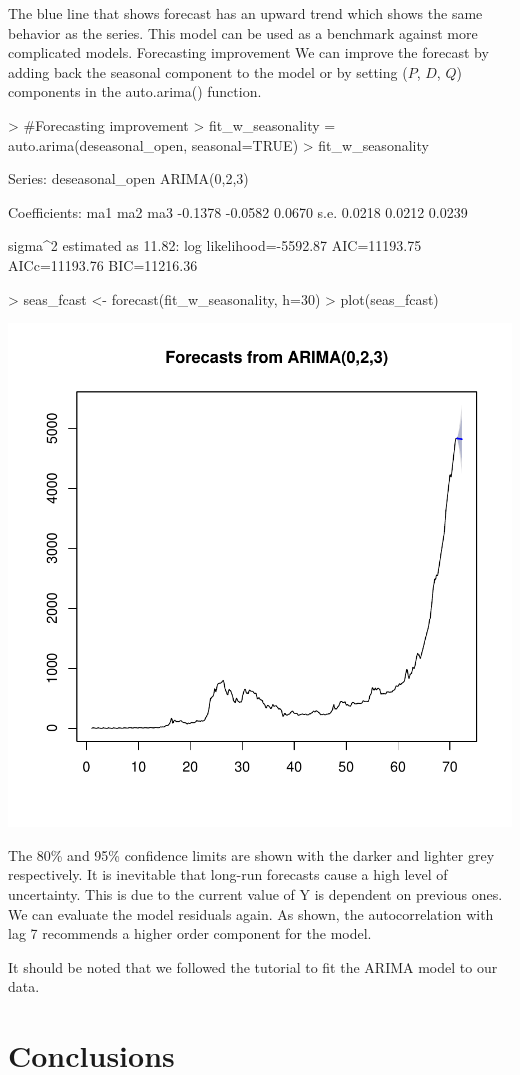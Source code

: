 \documentclass{article}
\begin{document}
The blue line that shows forecast has an upward trend which shows the same behavior as the series. This model can be used as a benchmark against more complicated models.
Forecasting improvement  
We can improve the forecast by adding back the seasonal component to the model or by setting ($P$, $D$, $Q$) components in the auto.arima() function. 
\begin{Schunk}
\begin{Sinput}
> #Forecasting improvement
>  fit_w_seasonality = auto.arima(deseasonal_open, seasonal=TRUE)
>  fit_w_seasonality
\end{Sinput}
\begin{Soutput}
Series: deseasonal_open 
ARIMA(0,2,3) 

Coefficients:
          ma1      ma2     ma3
      -0.1378  -0.0582  0.0670
s.e.   0.0218   0.0212  0.0239

sigma^2 estimated as 11.82:  log likelihood=-5592.87
AIC=11193.75   AICc=11193.76   BIC=11216.36
\end{Soutput}
\begin{Sinput}
>  seas_fcast <- forecast(fit_w_seasonality, h=30)
>  plot(seas_fcast)
\end{Sinput}
\end{Schunk}
\includegraphics{Report-025}

The 80\% and 95\% confidence limits are shown with the darker and lighter grey respectively. It is inevitable that long-run forecasts cause a high level of uncertainty. This is due to the current value of Y is dependent on previous ones.
We can evaluate the model residuals again. As shown, the autocorrelation with lag 7 recommends a higher order component for the model.

It should be noted that we followed the tutorial to fit the ARIMA model to our data. 

\section{Conclusions}
\end{document}
